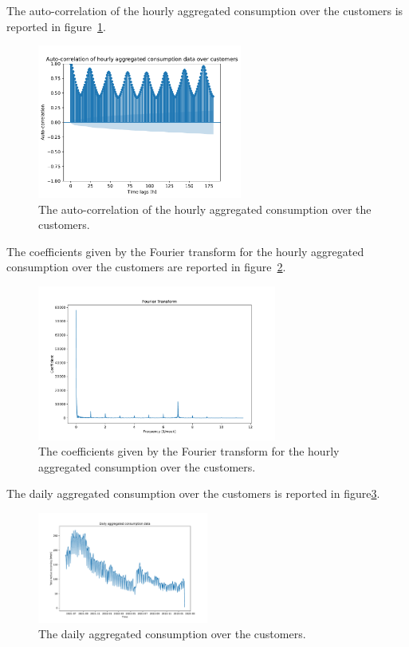 The auto-correlation of the hourly aggregated consumption over the customers is reported in figure~\ref{fig:demandcorrelation}. %

\begin{figure}[H]
\centering
\includegraphics[width=0.6\textwidth]{images/demand/hourly_correlation_week_range}
\caption{The auto-correlation of the hourly aggregated consumption over the customers.}
\label{fig:demandcorrelation}
\end{figure}

The coefficients given by the Fourier transform for the hourly aggregated consumption over the customers are reported in figure~\ref{fig:demandft}. %

\begin{figure}[H]
\centering
\includegraphics[width=0.7\textwidth]{images/demand/ft_hour_week}
\caption{The coefficients given by the Fourier transform for the hourly aggregated consumption over the customers.}
\label{fig:demandft}
\end{figure}

The daily aggregated consumption over the customers is reported in figure\ref{fig:demanddataplotday}.

\begin{figure}[H]
\centering
\includegraphics[width=0.5\textwidth]{images/demand/data_day_aggregated_plot}
\caption{The daily aggregated consumption over the customers.}
\label{fig:demanddataplotday}
\end{figure}

